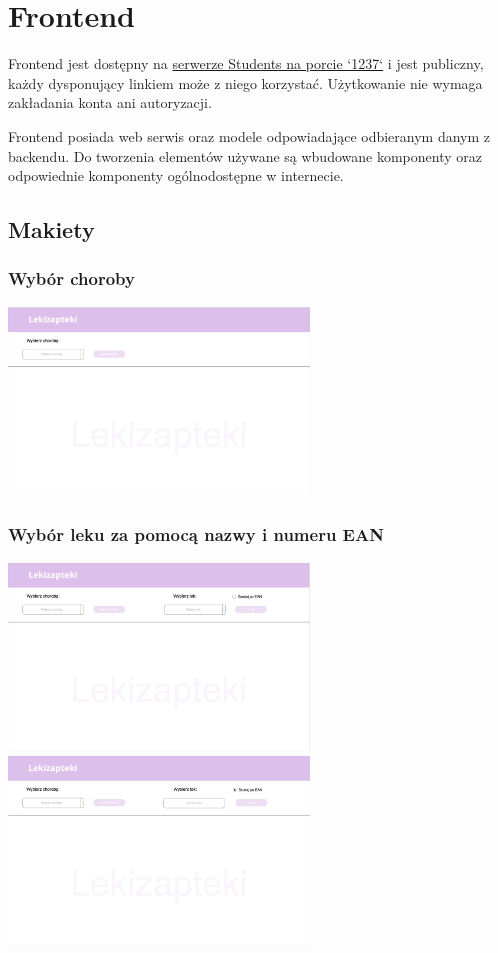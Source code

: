 \documentclass{article}
\begin{document}
  \section{Frontend}
  Frontend jest dostępny na
  \href{http://students.mimuw.edu.pl:1237}{serwerze Students na porcie `1237`} i jest publiczny,
  każdy dysponujący linkiem może z niego korzystać.
  Użytkowanie nie wymaga zakładania konta ani autoryzacji.

  Frontend posiada web serwis oraz modele odpowiadające odbieranym danym z backendu.
  Do tworzenia elementów używane są wbudowane komponenty oraz odpowiednie komponenty ogólnodostępne w internecie.

  \subsection{Makiety}
  \subsubsection{Wybór choroby}
  \includegraphics[width=8cm]{images/lekizapteki-wybor-choroby}

  \subsubsection{Wybór leku za pomocą nazwy i numeru EAN}
  \includegraphics[width=8cm]{images/lekizapteki-wybor-leku-nazwa}
  \includegraphics[width=8cm]{images/lekizapteki-wybor-leku-ean}
\end{document}
